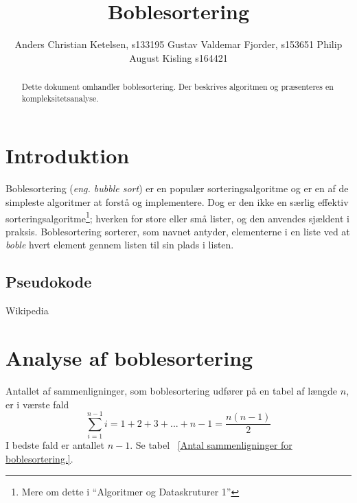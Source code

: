 \documentclass[12pt,a4paper]{article}
\author{Anders Christian Ketelsen, s133195 Gustav Valdemar Fjorder, s153651 Philip August Kisling s164421}
\title{Boblesortering}
\begin{document}
\maketitle
\begin{abstract}
Dette dokument omhandler boblesortering. Der beskrives algoritmen og præsenteres en kompleksitetsanalyse.
\end{abstract}
\section{Introduktion}
Boblesortering (\textsl{eng. bubble sort}) er en populær sorteringsalgoritme og er en af de simpleste algoritmer at forstå og implementere. Dog er den ikke en særlig effektiv sorteringsalgoritme\footnote{Mere om dette i ``Algoritmer og Dataskruturer 1''}; hverken for store eller små lister, og den anvendes sjældent i praksis. Boblesortering sorterer, som navnet antyder, elementerne i en liste ved at \textsl{boble} hvert element gennem listen til sin plads i listen.


\subsection{Pseudokode}

Wikipedia 

\section{Analyse af boblesortering}
Antallet af sammenligninger, som boblesortering udfører på en tabel af længde $n$, er i værste fald
\[\sum_{i=1}^{n-1}i=1+2+3+...+n-1=\frac{n(n-1)}{2}\]
I bedste fald er antallet $n-1$. Se tabel ~\ref{Antal sammenligninger for boblesortering.}.
\end{document}
